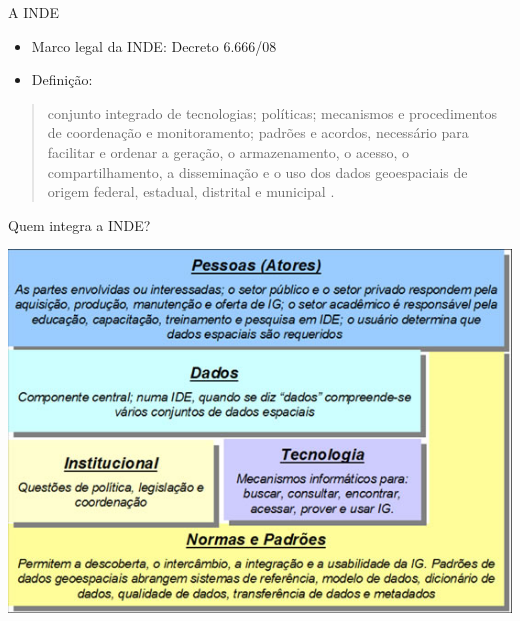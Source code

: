 \documentclass[9pt,ignorenonframetext,]{beamer}
\providecommand{\tightlist}{%
  \setlength{\itemsep}{0pt}\setlength{\parskip}{0pt}}
\begin{document}
\begin{frame}{A INDE}
\protect\hypertarget{a-inde}{}

\begin{itemize}[<+->]
\tightlist
\item
  Marco legal da INDE: Decreto 6.666/08
\end{itemize}

\begin{itemize}[<+->]
\tightlist
\item
  Definição:
\end{itemize}

\begin{quote}
conjunto integrado de tecnologias; políticas; mecanismos e procedimentos
de coordenação e monitoramento; padrões e acordos, necessário para
facilitar e ordenar a geração, o armazenamento, o acesso, o
compartilhamento, a disseminação e o uso dos dados geoespaciais de
origem federal, estadual, distrital e municipal \autocite{INDE}.
\end{quote}

\end{frame}

\begin{frame}{Quem integra a INDE?}
\protect\hypertarget{quem-integra-a-inde}{}

\begin{center}\includegraphics[width=0.7\linewidth]{Compenentes_INDE_2} \end{center}

\end{frame}
\end{document}
